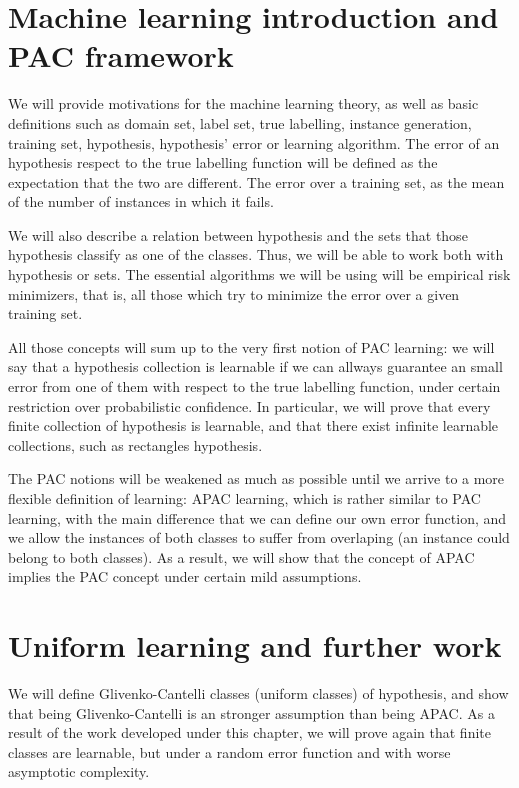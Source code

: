 \section*{Machine learning introduction and PAC framework}
We will provide motivations for the machine learning theory, as well as basic definitions such as domain set, label set, 
true labelling, instance generation, training set, hypothesis, hypothesis' error or learning algorithm. The error of an
hypothesis respect to the true labelling function will be defined as the expectation that the two are different. The error over
a training set, as the mean of the number of instances in which it fails.

We will also describe a relation between hypothesis and the sets that those hypothesis classify as one of the classes. Thus,
we will be able to work both with hypothesis or sets. The essential algorithms we will be using will be empirical risk 
minimizers, that is, all those which try to minimize the error over a given training set.

All those concepts will sum up to the very first notion of PAC learning: we will say that a hypothesis collection is 
learnable if we can allways guarantee an small error from one of them with respect to the true labelling function, under
certain restriction over probabilistic confidence. In particular, we will prove that every finite collection of hypothesis
is learnable, and that there exist infinite learnable collections, such as rectangles hypothesis.

The PAC notions will be weakened as much as possible until we arrive to a more flexible definition of learning: APAC 
learning, which is rather similar to PAC learning, with the main difference that we can define our own error function,
and we allow the instances of both classes to suffer from overlaping (an instance could belong to both classes). As
a result, we will show that the concept of APAC implies the PAC concept under certain mild assumptions.


\section*{Uniform learning and further work}

We will define Glivenko-Cantelli classes (uniform classes) of hypothesis, and show that being Glivenko-Cantelli is an
stronger assumption than being APAC. As a result of the work developed under this chapter, we will prove again that finite
classes are learnable, but under a random error function and with worse asymptotic complexity.

